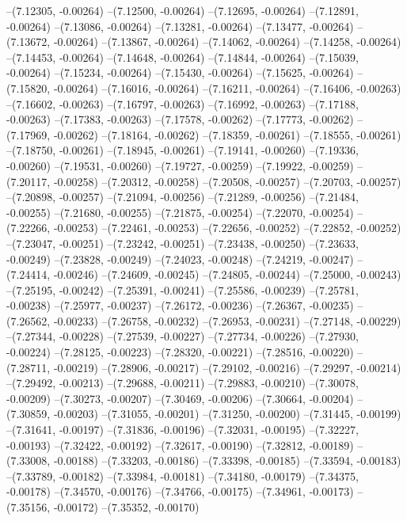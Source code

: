 --(7.12305, -0.00264)
--(7.12500, -0.00264)
--(7.12695, -0.00264)
--(7.12891, -0.00264)
--(7.13086, -0.00264)
--(7.13281, -0.00264)
--(7.13477, -0.00264)
--(7.13672, -0.00264)
--(7.13867, -0.00264)
--(7.14062, -0.00264)
--(7.14258, -0.00264)
--(7.14453, -0.00264)
--(7.14648, -0.00264)
--(7.14844, -0.00264)
--(7.15039, -0.00264)
--(7.15234, -0.00264)
--(7.15430, -0.00264)
--(7.15625, -0.00264)
--(7.15820, -0.00264)
--(7.16016, -0.00264)
--(7.16211, -0.00264)
--(7.16406, -0.00263)
--(7.16602, -0.00263)
--(7.16797, -0.00263)
--(7.16992, -0.00263)
--(7.17188, -0.00263)
--(7.17383, -0.00263)
--(7.17578, -0.00262)
--(7.17773, -0.00262)
--(7.17969, -0.00262)
--(7.18164, -0.00262)
--(7.18359, -0.00261)
--(7.18555, -0.00261)
--(7.18750, -0.00261)
--(7.18945, -0.00261)
--(7.19141, -0.00260)
--(7.19336, -0.00260)
--(7.19531, -0.00260)
--(7.19727, -0.00259)
--(7.19922, -0.00259)
--(7.20117, -0.00258)
--(7.20312, -0.00258)
--(7.20508, -0.00257)
--(7.20703, -0.00257)
--(7.20898, -0.00257)
--(7.21094, -0.00256)
--(7.21289, -0.00256)
--(7.21484, -0.00255)
--(7.21680, -0.00255)
--(7.21875, -0.00254)
--(7.22070, -0.00254)
--(7.22266, -0.00253)
--(7.22461, -0.00253)
--(7.22656, -0.00252)
--(7.22852, -0.00252)
--(7.23047, -0.00251)
--(7.23242, -0.00251)
--(7.23438, -0.00250)
--(7.23633, -0.00249)
--(7.23828, -0.00249)
--(7.24023, -0.00248)
--(7.24219, -0.00247)
--(7.24414, -0.00246)
--(7.24609, -0.00245)
--(7.24805, -0.00244)
--(7.25000, -0.00243)
--(7.25195, -0.00242)
--(7.25391, -0.00241)
--(7.25586, -0.00239)
--(7.25781, -0.00238)
--(7.25977, -0.00237)
--(7.26172, -0.00236)
--(7.26367, -0.00235)
--(7.26562, -0.00233)
--(7.26758, -0.00232)
--(7.26953, -0.00231)
--(7.27148, -0.00229)
--(7.27344, -0.00228)
--(7.27539, -0.00227)
--(7.27734, -0.00226)
--(7.27930, -0.00224)
--(7.28125, -0.00223)
--(7.28320, -0.00221)
--(7.28516, -0.00220)
--(7.28711, -0.00219)
--(7.28906, -0.00217)
--(7.29102, -0.00216)
--(7.29297, -0.00214)
--(7.29492, -0.00213)
--(7.29688, -0.00211)
--(7.29883, -0.00210)
--(7.30078, -0.00209)
--(7.30273, -0.00207)
--(7.30469, -0.00206)
--(7.30664, -0.00204)
--(7.30859, -0.00203)
--(7.31055, -0.00201)
--(7.31250, -0.00200)
--(7.31445, -0.00199)
--(7.31641, -0.00197)
--(7.31836, -0.00196)
--(7.32031, -0.00195)
--(7.32227, -0.00193)
--(7.32422, -0.00192)
--(7.32617, -0.00190)
--(7.32812, -0.00189)
--(7.33008, -0.00188)
--(7.33203, -0.00186)
--(7.33398, -0.00185)
--(7.33594, -0.00183)
--(7.33789, -0.00182)
--(7.33984, -0.00181)
--(7.34180, -0.00179)
--(7.34375, -0.00178)
--(7.34570, -0.00176)
--(7.34766, -0.00175)
--(7.34961, -0.00173)
--(7.35156, -0.00172)
--(7.35352, -0.00170)
